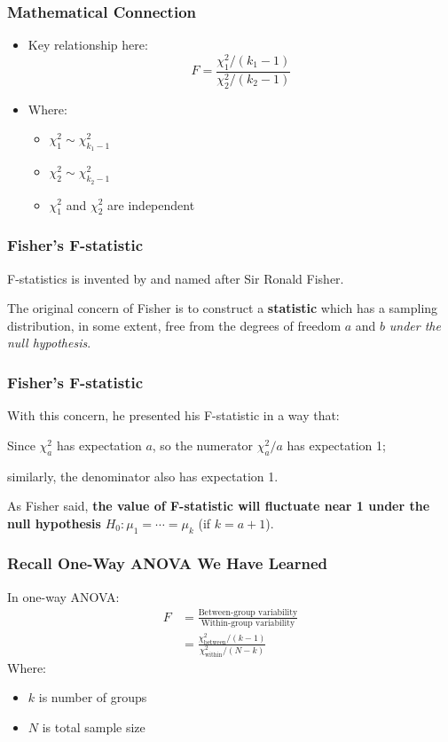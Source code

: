 \documentclass[12pt]{beamer}
\begin{document}
	\begin{frame}
		\frametitle{Mathematical Connection}
		\begin{itemize}[label={\color{blue}$\blacktriangleright$}]
			\item Key relationship here:
			$$F = \frac{\chi^2_1/(k_1-1)}{\chi^2_2/(k_2-1)}$$
			\item Where:
			\begin{itemize}[label={\color{blue}$\blacktriangleright$}]
				\item $\chi^2_1 \sim \chi^2_{k_1-1}$
				\item $\chi^2_2 \sim \chi^2_{k_2-1}$
				\item $\chi^2_1$ and $\chi^2_2$ are independent
			\end{itemize}
		\end{itemize}
	\end{frame}
\begin{frame}
	\frametitle{Fisher's F-statistic}
	F-statistics is invented by and named after Sir Ronald Fisher.
	\vspace{0.5cm}
	
	The original concern of Fisher is to construct a \textbf{statistic} which has a sampling 
	distribution, in some extent, free from the degrees of freedom $a$ and $b$ \textit{under 
		the null hypothesis}.

	
\end{frame}
\begin{frame}
	\frametitle{Fisher's F-statistic}
With this concern, he presented his F-statistic in a way that:
\vspace{0.5cm}

Since $\chi^2_a$ has expectation $a$, so the numerator $\chi^2_a/a$ has expectation 1; 
\vspace{0.5cm}

similarly, the denominator also has expectation 1.
\vspace{0.7cm}

As Fisher said, \textbf{the value of F-statistic will fluctuate near 1 under the null hypothesis} $H_0: \mu_1 = 
\cdots = \mu_k$ (if $k = a + 1$).
\end{frame}
	\begin{frame}
		\frametitle{Recall One-Way ANOVA We Have Learned}
		In one-way ANOVA:
		\begin{align*}
			F &= \frac{\text{Between-group variability}}{\text{Within-group variability}} \\
			&= \frac{\chi^2_{\text{between}}/(k-1)}{\chi^2_{\text{within}}/(N-k)}
		\end{align*}
		Where:
		\begin{itemize}[label={\color{blue}$\blacktriangleright$}]
			\item $k$ is number of groups
			\item $N$ is total sample size
		\end{itemize}
	\end{frame}
	
\end{document}
